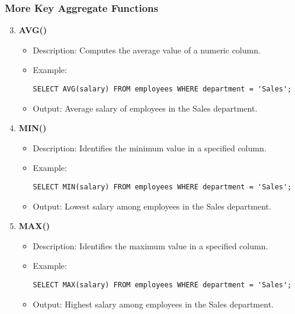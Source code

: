 \documentclass[aspectratio=169]{beamer}
\begin{document}
\begin{frame}[fragile]
    \frametitle{More Key Aggregate Functions}
    \begin{enumerate}
        \setcounter{enumi}{2} %
        \item \textbf{AVG()}
            \begin{itemize}
                \item Description: Computes the average value of a numeric column.
                \item Example:
                \begin{lstlisting}
SELECT AVG(salary) FROM employees WHERE department = 'Sales';
                \end{lstlisting}
                \item Output: Average salary of employees in the Sales department.
            \end{itemize}
        
        \item \textbf{MIN()}
            \begin{itemize}
                \item Description: Identifies the minimum value in a specified column.
                \item Example:
                \begin{lstlisting}
SELECT MIN(salary) FROM employees WHERE department = 'Sales';
                \end{lstlisting}
                \item Output: Lowest salary among employees in the Sales department.
            \end{itemize}
        
        \item \textbf{MAX()}
            \begin{itemize}
                \item Description: Identifies the maximum value in a specified column.
                \item Example:
                \begin{lstlisting}
SELECT MAX(salary) FROM employees WHERE department = 'Sales';
                \end{lstlisting}
                \item Output: Highest salary among employees in the Sales department.
            \end{itemize}
    \end{enumerate}
\end{frame}
\end{document}
